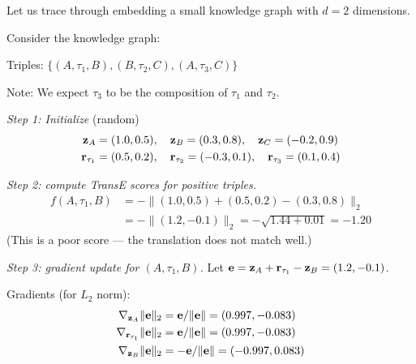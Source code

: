 \begin{notechapter}
Let us trace through embedding a small knowledge graph with $d = 2$ dimensions.

\begin{example}
Consider the knowledge graph:
\begin{center}
\end{center}

Triples: $\{(A, \tau_1, B), (B, \tau_2, C), (A, \tau_3, C)\}$

Note: We expect $\tau_3$ to be the composition of $\tau_1$ and $\tau_2$.

\emph{Step 1: Initialize} (random)
\begin{align*}
\mathbf{z}_A &= (1.0, 0.5), \quad \mathbf{z}_B = (0.3, 0.8), \quad \mathbf{z}_C = (-0.2, 0.9) \\
\mathbf{r}_{\tau_1} &= (0.5, 0.2), \quad \mathbf{r}_{\tau_2} = (-0.3, 0.1), \quad \mathbf{r}_{\tau_3} = (0.1, 0.4)
\end{align*}

\emph{Step 2: compute TransE scores for positive triples.}
\begin{align*}
f(A, \tau_1, B) &= -\|(1.0, 0.5) + (0.5, 0.2) - (0.3, 0.8)\|_2 \\
&= -\|(1.2, -0.1)\|_2 = -\sqrt{1.44 + 0.01} = -1.20
\end{align*}
(This is a poor score --- the translation does not match well.)

\emph{Step 3: gradient update for $(A, \tau_1, B)$.}
Let $\mathbf{e} = \mathbf{z}_A + \mathbf{r}_{\tau_1} - \mathbf{z}_B = (1.2, -0.1)$.

Gradients (for $L_2$ norm):
\begin{align*}
\nabla_{\mathbf{z}_A} \|\mathbf{e}\|_2 &= \mathbf{e}/\|\mathbf{e}\| = (0.997, -0.083) \\
\nabla_{\mathbf{r}_{\tau_1}} \|\mathbf{e}\|_2 &= \mathbf{e}/\|\mathbf{e}\| = (0.997, -0.083) \\
\nabla_{\mathbf{z}_B} \|\mathbf{e}\|_2 &= -\mathbf{e}/\|\mathbf{e}\| = (-0.997, 0.083)
\end{align*}


\end{example}
\end{notechapter}
